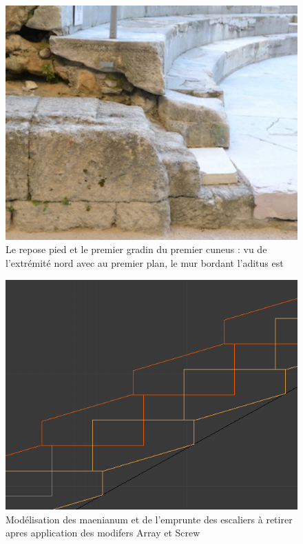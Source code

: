 		\begin{figure}[!h] %
			\center
			\includegraphics[scale=0.3]{images/gradinCoupe}
			\caption[Repose pied et premier gradin du premier cuneus]{Le repose pied et le premier gradin du premier cuneus : vu de l'extrémité nord avec au premier plan, le mur bordant l'aditus est} %
			\label{coupeGradin} %
		\end{figure} %
		
		\begin{figure}[!h] 
			\center
			\includegraphics[scale=0.3]{images/escaliers}
			\caption[Modélisation des maenianum]{Modélisation des maenianum et de l'emprunte des escaliers à retirer apres application des modifers Array et Screw}
		\end{figure}
		
